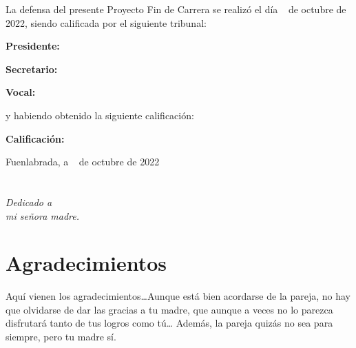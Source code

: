 \documentclass[a4paper, 12pt]{book}
\begin{document}
\vspace{1cm}
La defensa del presente Proyecto Fin de Carrera se realizó el día \qquad$\;\,$ de octubre de 2022, siendo calificada por el siguiente tribunal:


\vspace{0.5cm}
\textbf{Presidente:}

\vspace{1.2cm}
\textbf{Secretario:}

\vspace{1.2cm}
\textbf{Vocal:}


\vspace{1.2cm}
y habiendo obtenido la siguiente calificación:

\vspace{1cm}
\textbf{Calificación:}


\vspace{1cm}
\begin{flushright}
Fuenlabrada, a \qquad$\;\,$ de octubre de 2022
\end{flushright}


\chapter*{}
\begin{flushright}
\textit{Dedicado a \\
mi señora madre.}
\end{flushright}


\chapter*{Agradecimientos}

Aquí vienen los agradecimientos\ldots Aunque está bien acordarse de la pareja, no hay que olvidarse de dar las gracias a tu madre, que aunque a veces no lo parezca disfrutará tanto de tus logros como tú\ldots 
Además, la pareja quizás no sea para siempre, pero tu madre sí.

\end{document}
